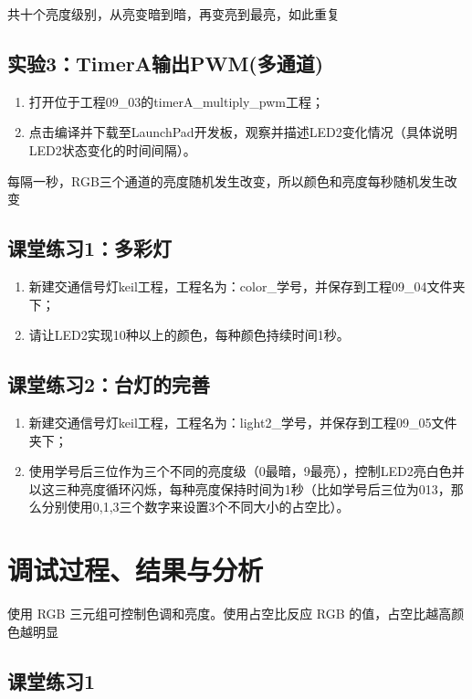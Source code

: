 \documentclass[a4paper,10pt,UTF8]{paper}
\numberwithin{equation}{section}
\numberwithin{figure}{section}
\begin{document}
共十个亮度级别，从亮变暗到暗，再变亮到最亮，如此重复

\subsection{实验3：TimerA输出PWM(多通道)}

\begin{enumerate}
  \item 打开位于工程09\_03的timerA\_multiply\_pwm工程；
  \item 点击编译并下载至LaunchPad开发板，观察并描述LED2变化情况（具体说明LED2状态变化的时间间隔）。
\end{enumerate}

每隔一秒，RGB三个通道的亮度随机发生改变，所以颜色和亮度每秒随机发生改变

\subsection{课堂练习1：多彩灯}

\begin{enumerate}
  \item 新建交通信号灯keil工程，工程名为：color\_学号，并保存到工程09\_04文件夹下；
  \item 请让LED2实现10种以上的颜色，每种颜色持续时间1秒。
\end{enumerate}

\subsection{课堂练习2：台灯的完善}

\begin{enumerate}
  \item 新建交通信号灯keil工程，工程名为：light2\_学号，并保存到工程09\_05文件夹下；
  \item 使用学号后三位作为三个不同的亮度级（0最暗，9最亮），控制LED2亮白色并以这三种亮度循环闪烁，每种亮度保持时间为1秒（比如学号后三位为013，那么分别使用0,1,3三个数字来设置3个不同大小的占空比）。
\end{enumerate}

\section{调试过程、结果与分析}

使用 RGB 三元组可控制色调和亮度。使用占空比反应 RGB 的值，占空比越高颜色越明显

\subsection{课堂练习1}
\end{document}
